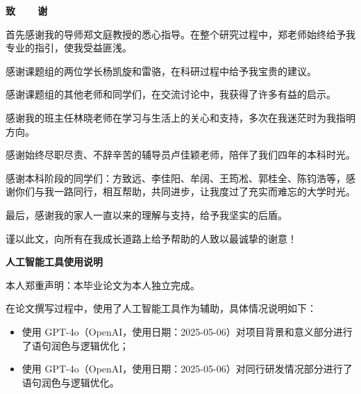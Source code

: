 \cleardoublepage{}
\vspace*{-2em}
\begin{center}
    \bfseries {} 致~~~~谢
\end{center}

首先感谢我的导师郑文庭教授的悉心指导。在整个研究过程中，郑老师始终给予我专业的指引，使我受益匪浅。

感谢课题组的两位学长杨凯旋和雷骆，在科研过程中给予我宝贵的建议。

感谢课题组的其他老师和同学们，在交流讨论中，我获得了许多有益的启示。

感谢我的班主任林晓老师在学习与生活上的关心和支持，多次在我迷茫时为我指明方向。

感谢始终尽职尽责、不辞辛苦的辅导员卢佳颖老师，陪伴了我们四年的本科时光。

感谢本科阶段的同学们：方致远、李佳阳、牟阔、王筠凇、郭桂全、陈钧浩等，感谢你们与我一路同行，相互帮助，共同进步，让我度过了充实而难忘的大学时光。

最后，感谢我的家人一直以来的理解与支持，给予我坚实的后盾。

谨以此文，向所有在我成长道路上给予帮助的人致以最诚挚的谢意！

\newpage
\vspace*{-2em}
\begin{center}
    \bfseries {} 人工智能工具使用说明
\end{center}

本人郑重声明：本毕业论文为本人独立完成。

在论文撰写过程中，使用了人工智能工具作为辅助，具体情况说明如下：

\begin{itemize}
    \item 使用 GPT-4o（OpenAI，使用日期：2025-05-06）对项目背景和意义部分进行了语句润色与逻辑优化；

    \item 使用 GPT-4o（OpenAI，使用日期：2025-05-06）对同行研发情况部分进行了语句润色与逻辑优化。
\end{itemize}